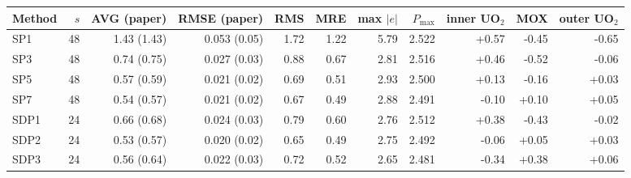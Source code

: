 \begin{tabular}{lrrrrrrrrrr}
\hline
Method & $s$ & AVG (paper) & RMSE (paper) & RMS & MRE & max $|e|$ & $P_{\max}$ & inner UO$_2$ & MOX & outer UO$_2$ \\
\hline
SP1 & 48 & 1.43 (1.43) & 0.053 (0.05) & 1.72 & 1.22 & 5.79 & 2.522 & +0.57 & -0.45 & -0.65 \\
SP3 & 48 & 0.74 (0.75) & 0.027 (0.03) & 0.88 & 0.67 & 2.81 & 2.516 & +0.46 & -0.52 & -0.06 \\
SP5 & 48 & 0.57 (0.59) & 0.021 (0.02) & 0.69 & 0.51 & 2.93 & 2.500 & +0.13 & -0.16 & +0.03 \\
SP7 & 48 & 0.54 (0.57) & 0.021 (0.02) & 0.67 & 0.49 & 2.88 & 2.491 & -0.10 & +0.10 & +0.05 \\
SDP1 & 24 & 0.66 (0.68) & 0.024 (0.03) & 0.79 & 0.60 & 2.76 & 2.512 & +0.38 & -0.43 & -0.02 \\
SDP2 & 24 & 0.53 (0.57) & 0.020 (0.02) & 0.65 & 0.49 & 2.75 & 2.492 & -0.06 & +0.05 & +0.03 \\
SDP3 & 24 & 0.56 (0.64) & 0.022 (0.03) & 0.72 & 0.52 & 2.65 & 2.481 & -0.34 & +0.38 & +0.06 \\
\hline
\end{tabular}
